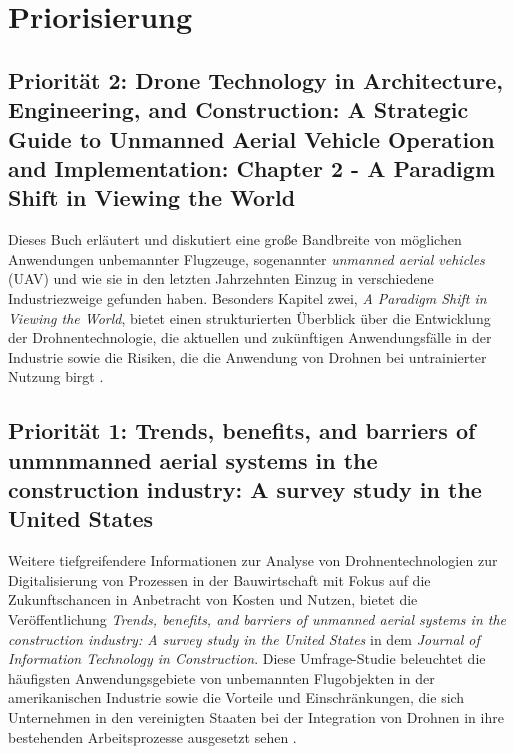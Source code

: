 \chapter{Priorisierung}\label{ch:priorisation}

\section{Priorität 2: Drone Technology in Architecture, Engineering, and Construction: A Strategic Guide to Unmanned Aerial Vehicle Operation and Implementation: Chapter 2 - A Paradigm Shift in Viewing the World}

Dieses Buch erläutert und diskutiert eine große Bandbreite von möglichen Anwendungen unbemannter Flugzeuge, sogenannter \textit{unmanned aerial vehicles} (UAV) und wie sie in den letzten Jahrzehnten Einzug in verschiedene Industriezweige gefunden haben.
Besonders Kapitel zwei, \textit{A Paradigm Shift in Viewing the World}, bietet einen strukturierten Überblick über die Entwicklung der Drohnentechnologie, die aktuellen und zukünftigen Anwendungsfälle in der Industrie sowie die Risiken, die die Anwendung von Drohnen bei untrainierter Nutzung birgt \cite{Tal2021}.

\section{Priorität 1: Trends, benefits, and barriers of unmnmanned aerial systems in the construction industry: A survey study in the United States}

Weitere tiefgreifendere Informationen zur Analyse von Drohnentechnologien zur Digitalisierung von Prozessen in der Bauwirtschaft mit Fokus auf die Zukunftschancen in Anbetracht von Kosten und Nutzen, bietet die Veröffentlichung \textit{Trends, benefits, and barriers of unmanned aerial systems in the construction industry: A survey study in the United States} in dem \textit{Journal of Information Technology in Construction}.
Diese Umfrage-Studie beleuchtet die häufigsten Anwendungsgebiete von unbemannten Flugobjekten in der amerikanischen Industrie sowie die Vorteile und Einschränkungen, die sich Unternehmen in den vereinigten Staaten bei der Integration von Drohnen in ihre bestehenden Arbeitsprozesse ausgesetzt sehen \cite{abaeano2021trends}.